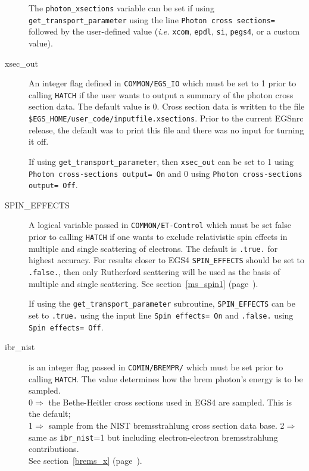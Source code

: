 \begin{description}
The {\tt photon\_xsections} variable can be set if using
{\tt get\_transport\_parameter} using the line
{\tt Photon cross sections= } followed by the user-defined value
({\em i.e.} {\tt xcom}, {\tt epdl}, {\tt si}, {\tt pegs4}, or
a custom value).

\item[xsec\_out] An integer flag defined in {\tt COMMON/EGS\_IO} which must
be set to 1 prior to calling {\tt HATCH} if the user wants to output a summary
of the photon cross section data.  The default value is 0.  Cross section
data is written to the file\\ {\tt \$EGS\_HOME/user\_code/inputfile.xsections}.
Prior to the current EGSnrc release, the default was to print this file and
there was no input for turning it off.

If using {\tt get\_transport\_parameter}, then {\tt xsec\_out} can be set
to 1 using {\tt Photon cross-sections output= On} and 0 using
{\tt Photon cross-sections output= Off}.

\item[SPIN\_EFFECTS] A logical variable passed in {\tt COMMON/ET-Control}
which must be set false prior to calling {\tt HATCH} if one wants to exclude
relativistic spin effects in multiple and single scattering of electrons.
The default is {\tt .true.} for highest accuracy. For results
closer to EGS4 {\tt SPIN\_EFFECTS} should be set to {\tt .false.},
then only Rutherford scattering will be used as the
basis of multiple and single scattering.  See section~\ref{ms_spin1}
(page~\pageref{ms_spin1}).

If using the {\tt get\_transport\_parameter} subroutine, {\tt SPIN\_EFFECTS} can
be set to {\tt .true.} using the input line
{\tt Spin effects= On} and {\tt .false.} using {\tt Spin effects= Off}.


\item[ibr\_nist] is an integer flag passed in {\tt COMIN/BREMPR/} which
must be set prior to calling {\tt HATCH}. The value
determines how the brem photon's energy is to be sampled.\\
0$\Rightarrow$ the Bethe-Heitler cross sections used in EGS4 are sampled.
This is the default;\\
1$\Rightarrow$ sample from the NIST bremsstrahlung cross section data
base\cite{SB85,SB86a}.
2$\Rightarrow$ same as {\tt ibr\_nist}=1 but including electron-electron
bremsstrahlung contributions.
\\ See section~\ref{brems_x}
(page~\pageref{brems_x}).


\end{description}
